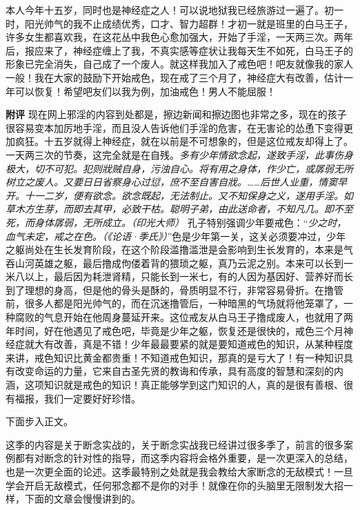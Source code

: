 \begin{case}
    本人今年十五岁，同时也是神经症之人！可以说地狱我已经旅游过一遍了。初一时，阳光帅气的我不止成绩优秀，口才、智力超群！才初一就是班里的白马王子，许多女生都喜欢我，在这花丛中我色心愈加强大，开始了手淫，一天两三次。两年后，报应来了，神经症缠上了我，不真实感等症状让我每天生不如死，白马王子的形象已完全消失，自己成了一个废人。就这样我加入了戒色吧！吧友就像我的家人一般！我在大家的鼓励下开始戒色，现在戒了三个月了，神经症大有改善，估计一年可以恢复！希望吧友们以我为例，加油戒色！男人不能屈服！

    \textbf{附评} 现在网上邪淫的内容到处都是，擦边新闻和擦边图也非常之多，现在的孩子很容易变本加厉地手淫，而且没人告诉他们手淫的危害，在无害论的怂恿下变得更加疯狂。十五岁就得上神经症，就在以前是不可想象的，但是这位戒友却得上了。一天两三次的节奏，这完全就是在自残。\textit{多有少年情欲念起，遂致手淫，此事伤身极大，切不可犯。犯则戕贼自身，污浊自心。将有用之身体，作少亡，或孱弱无所树立之废人。又要日日省察身心过愆，庶不至自害自戕。……后世人业重，情窦早开。十一二岁，便有欲念。欲念既起，无法制止。又不知保身之义，遂用手淫。如草木方生芽，而即去其甲，必致干枯。聪明子弟，由此送命者，不知凡几。即不至死，而身体孱弱，无所成立。（印光大师）} 孔子特别强调少年要戒色：“\textit{少之时，血气未定，戒之在色。（《论语·季氏》）}”色是少年第一关，这关必须要冲过，少年之躯尚处在生长发育阶段，在这个阶段滥撸滥泄是会影响到生长发育的，本来是气吞山河英雄之躯，最后撸成佝偻着背的猥琐之躯，真乃云泥之别。本来可以长到一米八以上，最后因为耗泄肾精，只能长到一米七，有的人因为基因好、营养好而长到了理想的身高，但是他的骨头是酥的，骨质明显不行，非常容易骨折。在撸管前，很多人都是阳光帅气的，而在沉迷撸管后，一种暗黑的气场就将他笼罩了，一种腐败的气息开始在他周身蔓延开来。这位戒友从白马王子撸成废人，也就用了两年时间，好在他遇见了戒色吧，毕竟是少年之躯，恢复还是很快的，戒色三个月神经症就大有改善，真是不错！少年最最要紧的就是要知道戒色的知识，从某种程度来讲，戒色知识比黄金都贵重！不知道戒色知识，那真的是亏大了！有一种知识具有改变命运的力量，它来自古圣先贤的教诲和传承，具有高度的智慧和深刻的内涵，这项知识就是戒色的知识！真正能够学到这门知识的人，真的是很有善根、很有福报，我们一定要好好珍惜。
\end{case}

下面步入正文。

这季的内容是关于断念实战的，关于断念实战我已经讲过很多季了，前言的很多案例都有对断念的针对性的指导，而这季内容将会格外重要，是一次更深入的总结，也是一次更全面的论述。这季最特别之处就是我会教给大家断念的无敌模式！一旦学会开启无敌模式，任何邪念都不是你的对手！就像在你的头脑里无限制发大招一样，下面的文章会慢慢讲到的。

